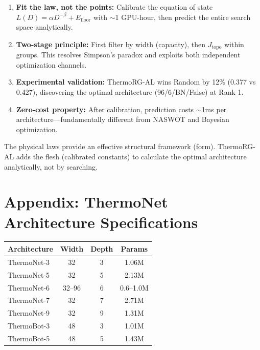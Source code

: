 \documentclass[11pt, a4paper]{article}
\theoremstyle{plain}
\begin{document}
\begin{enumerate}
\item \textbf{Fit the law, not the points:} Calibrate the equation of state $L(D) = \alpha D^{-\beta} + E_{\mathrm{floor}}$ with $\sim$1 GPU-hour, then predict the entire search space analytically.

\item \textbf{Two-stage principle:} First filter by width (capacity), then $J_{\mathrm{topo}}$ within groups. This resolves Simpson's paradox and exploits both independent optimization channels.

\item \textbf{Experimental validation:} ThermoRG-AL wins Random by 12\% (0.377 vs 0.427), discovering the optimal architecture (96/6/BN/False) at Rank 1.

\item \textbf{Zero-cost property:} After calibration, prediction costs $\sim$1ms per architecture---fundamentally different from NASWOT and Bayesian optimization.
\end{enumerate}

The physical laws provide an effective structural framework (form). ThermoRG-AL adds the flesh (calibrated constants) to calculate the optimal architecture analytically, not by searching.

\appendix

\section*{Appendix: ThermoNet Architecture Specifications}

\begin{center}
\begin{tabular}{lccc}
\toprule
Architecture & Width & Depth & Params \\
\midrule
ThermoNet-3 & 32 & 3 & 1.06M \\
ThermoNet-5 & 32 & 5 & 2.13M \\
ThermoNet-6 & 32--96 & 6 & 0.6--1.0M \\
ThermoNet-7 & 32 & 7 & 2.71M \\
ThermoNet-9 & 32 & 9 & 1.31M \\
ThermoBot-3 & 48 & 3 & 1.01M \\
ThermoBot-5 & 48 & 5 & 1.43M \\
\bottomrule
\end{tabular}
\end{center}
\end{document}
